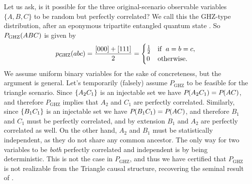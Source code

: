 Let us ask, is it possible for the three original-scenario observable variables $\{A,B,C\}$ to be random but perfectly correlated? We call this the GHZ-type distribution, after an eponymous tripartite entangled quantum state \cite{greenberger1989going,3Qubits2Ways}. So $P_{\text{GHZ}}\lparen A B C\rparen$ is given by
\begin{align}\label{eq:ghzdistribution1}
p_{\text{GHZ}}\lparen a b c\rparen=\frac{[000]+[111]}{2}=\begin{cases}\tfrac{1}{2}&\text{if }\; a=b=c, \\ 0&\text{otherwise}.\end{cases}
\end{align}
We assume uniform binary variables for the sake of concreteness, but the argument is general. Let's temporarily (falsely) assume $P_{\text{GHZ}}$ to be feasible for the triangle scenario. Since $\left\lbrace A_2 C_1\right\rbrace$ is an injectable set we have ${P_{}}\lparen A_2 C_1\rparen={P_{}}\lparen A C\rparen$, and therefore $P_{\text{GHZ}}$ implies that $A_2$ and $C_1$ are perfectly correlated. Similarly, since $\left\lbrace B_1 C_1\right\rbrace$ is an injectable set we have ${P_{}}\lparen B_1 C_1\rparen={P_{}}\lparen A C\rparen$, and therefore $B_1$ and $C_1$ must be perfectly correlated, and by extension $B_1$ and $A_2$ are perfectly correlated as well. On the other hand, $A_2$ and $B_1$ must be statistically independent, as they do not share any common ancestor. The only way for two variables to be \emph{both} perfectly correlated and independent is by being deterministic. This is not the case in $P_{\text{GHZ}}$, and thus we have certified that $P_{\text{GHZ}}$ is not realizable from the Triangle causal structure, recovering the seminal result of \citet{steudel2010ancestors}.

